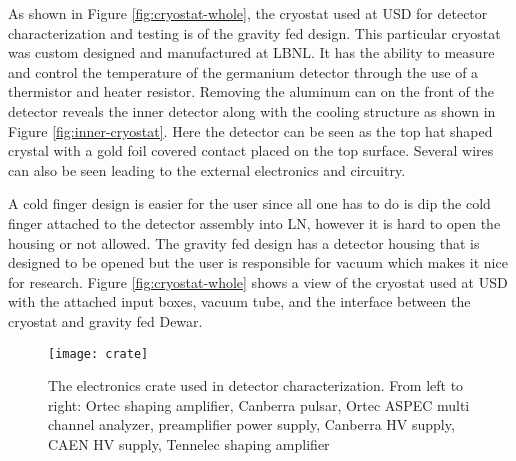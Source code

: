 As shown in Figure \ref{fig:cryostat-whole}, the cryostat used at USD for detector characterization and testing is of the gravity fed design.
This particular cryostat was custom designed and manufactured at LBNL.
It has the ability to measure and control the temperature of the germanium detector through the use of a thermistor and heater resistor.
Removing the aluminum can on the front of the detector reveals the inner detector along with the cooling structure as shown in Figure \ref{fig:inner-cryostat}.
Here the detector can be seen as the top hat shaped crystal with a gold foil covered contact placed on the top surface.
Several wires can also be seen leading to the external electronics and circuitry.

A cold finger design is easier for the user since all one has to do is dip the cold finger attached to the detector assembly into LN, however it is hard to open the housing or not allowed.
The gravity fed design has a detector housing that is designed to be opened but the user is responsible for vacuum which makes it nice for research.
Figure \ref{fig:cryostat-whole} shows a view of the cryostat used at USD with the attached input boxes, vacuum tube, and the interface between the cryostat and gravity fed Dewar.
\begin{figure}[htpb]
\centering
\texttt{[image: crate]}
\caption{The electronics crate used in detector characterization. From left to right: Ortec shaping amplifier, Canberra pulsar, Ortec ASPEC multi channel analyzer, preamplifier power supply, Canberra HV supply, CAEN HV supply, Tennelec shaping amplifier}
\label{fig:crate}
\end{figure}

